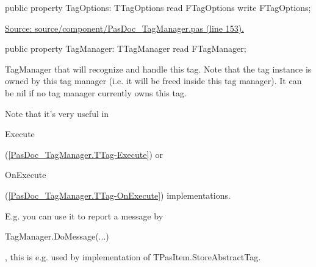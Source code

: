 \documentclass{report}
\newif\ifpdf
\begin{document}
\begin{list}{}{
\setlength{\itemindent}{0cm}
\setlength{\listparindent}{0cm}
\setlength{\leftmargin}{\evensidemargin}
\addtolength{\leftmargin}{\tmplength}
\settowidth{\labelsep}{X}
\addtolength{\leftmargin}{\labelsep}
\setlength{\labelwidth}{\tmplength}
}
\label{PasDoc_TagManager.TTag-TagOptions}
\item[\textbf{TagOptions}\hfill]
\ifpdf
\begin{flushleft}
\fi
\begin{ttfamily}
public property TagOptions: TTagOptions read FTagOptions write FTagOptions;\end{ttfamily}

\ifpdf
\end{flushleft}
\fi


\par  \par
\href{https://github.com/pasdoc/pasdoc/blob/master/source/component/PasDoc_TagManager.pas#L153}{Source: source/component/PasDoc{\_}TagManager.pas (line 153).}\label{PasDoc_TagManager.TTag-TagManager}
\item[\textbf{TagManager}\hfill]
\ifpdf
\begin{flushleft}
\fi
\begin{ttfamily}
public property TagManager: TTagManager read FTagManager;\end{ttfamily}

\ifpdf
\end{flushleft}
\fi


\par TagManager that will recognize and handle this tag. Note that the tag instance is owned by this tag manager (i.e. it will be freed inside this tag manager). It can be nil if no tag manager currently owns this tag.

Note that it's very useful in \begin{ttfamily}Execute\end{ttfamily}(\ref{PasDoc_TagManager.TTag-Execute}) or \begin{ttfamily}OnExecute\end{ttfamily}(\ref{PasDoc_TagManager.TTag-OnExecute}) implementations.

E.g. you can use it to report a message by \begin{ttfamily}TagManager.DoMessage(...)\end{ttfamily}, this is e.g. used by implementation of TPasItem.StoreAbstractTag.


\end{list}
\end{document}
